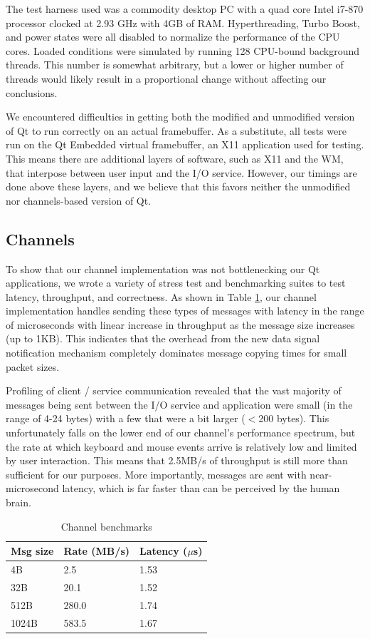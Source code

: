\documentclass[letterpaper,twocolumn,11pt]{article}
\begin{document}
The test harness used was a commodity desktop PC with a quad core Intel i7-870 processor clocked at 2.93 GHz with 4GB of RAM. Hyperthreading, Turbo Boost, and power states were all disabled to normalize the performance of the CPU cores. Loaded conditions were simulated by running 128 CPU-bound background threads. This number is somewhat arbitrary, but a lower or higher number of threads would likely result in a proportional change without affecting our conclusions.

We encountered difficulties in getting both the modified and unmodified version of Qt to run correctly on an actual framebuffer. As a substitute, all tests were run on the Qt Embedded virtual framebuffer, an X11 application used for testing. This means there are additional layers of software, such as X11 and the WM, that interpose between user input and the I/O service. However, our timings are done above these layers, and we believe that this favors neither the unmodified nor channels-based version of Qt.

\subsection{Channels}

To show that our channel implementation was not bottlenecking our Qt applications, we wrote a variety of stress test and benchmarking suites to test latency, throughput, and correctness. As shown in Table \ref{tab:channel}, our channel implementation handles sending these types of messages with latency in the range of microseconds with linear increase in throughput as the message size increases (up to 1KB). This indicates that the overhead from the new data signal notification mechanism completely dominates message copying times for small packet sizes.

Profiling of client / service communication revealed that the vast majority of messages being sent between the I/O service and application were small (in the range of 4-24 bytes) with a few that were a bit larger ($<$200 bytes). This unfortunately falls on the lower end of our channel's performance spectrum, but the rate at which keyboard and mouse events arrive is relatively low and limited by user interaction. This means that 2.5MB/s of throughput is still more than sufficient for our purposes. More importantly, messages are sent with near-microsecond latency, which is far faster than can be perceived by the human brain.

\begin{table}[tp]
\centering
\begin{tabular}{| l | l | l |}
\hline
Msg size	&Rate (MB/s)		& Latency ($\mu$s) \\ \hline
4B		&2.5	& 1.53 \\
32B		&20.1	& 1.52 \\
512B	&280.0	& 1.74 \\
1024B	&583.5	& 1.67 \\
\hline
\end{tabular}
\caption{Channel benchmarks}
\label{tab:channel}
\end{table}
\end{document}
